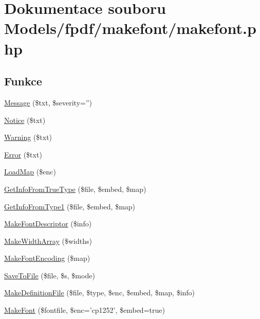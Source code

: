 \hypertarget{makefont_2makefont_8php}{\section{Dokumentace souboru Models/fpdf/makefont/makefont.php}
\label{makefont_2makefont_8php}
}
\subsection*{Funkce}
\begin{DoxyCompactItemize}
\item 
\hyperlink{makefont_2makefont_8php_a971f74d77a96a0c72721e33b05a31913}{Message} (\$txt, \$severity='')
\item 
\hyperlink{makefont_2makefont_8php_a350da5601143252db250f7bf3ca2c5c6}{Notice} (\$txt)
\item 
\hyperlink{makefont_2makefont_8php_ac3b83e4bc83ff322cbd88f70f269e7c2}{Warning} (\$txt)
\item 
\hyperlink{makefont_2makefont_8php_a8fb508c3ca3ccca6f318cb26631edfd4}{Error} (\$txt)
\item 
\hyperlink{makefont_2makefont_8php_a2fc077176f6f32e1885532112cc1a01f}{Load\-Map} (\$enc)
\item 
\hyperlink{makefont_2makefont_8php_a68e77911884a7079268d0f2664884223}{Get\-Info\-From\-True\-Type} (\$file, \$embed, \$map)
\item 
\hyperlink{makefont_2makefont_8php_a4dee0951be5f4f2e9333a709eca3096a}{Get\-Info\-From\-Type1} (\$file, \$embed, \$map)
\item 
\hyperlink{makefont_2makefont_8php_a2741a34186d086acfeb6b2899646381e}{Make\-Font\-Descriptor} (\$info)
\item 
\hyperlink{makefont_2makefont_8php_a2003a94dff4192e37e37c6b7cabc9da8}{Make\-Width\-Array} (\$widths)
\item 
\hyperlink{makefont_2makefont_8php_a6a51afba9135056d951a104d55f6af12}{Make\-Font\-Encoding} (\$map)
\item 
\hyperlink{makefont_2makefont_8php_abd2121a3e400e1df96d0dac02ade77a2}{Save\-To\-File} (\$file, \$s, \$mode)
\item 
\hyperlink{makefont_2makefont_8php_ae4056a117adb5d43924a455a73ab2bb9}{Make\-Definition\-File} (\$file, \$type, \$enc, \$embed, \$map, \$info)
\item 
\hyperlink{makefont_2makefont_8php_a15125ec0382d9f6c3f3e70e8fe3f8dba}{Make\-Font} (\$fontfile, \$enc='cp1252', \$embed=true)
\end{DoxyCompactItemize}


